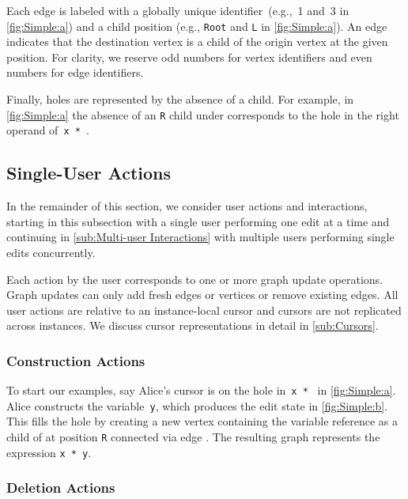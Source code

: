 Each edge is labeled with a globally unique identifier~(e.g.,~1 and~3 in \autoref{fig:Simple:a})
and a child position (e.g., \texttt{Root} and \texttt{L} in \autoref{fig:Simple:a}).
An edge indicates that the destination vertex is a child of the origin vertex at the given position.
For clarity, we reserve odd numbers for vertex identifiers and even numbers for edge identifiers.

Finally, holes are represented by the absence of a child.
For example, in \autoref{fig:Simple:a} the absence of an \texttt{R} child under \vSimpleTimes{}
corresponds to the hole in the right operand of~\texttt{x * \hole}.

\figureWrapMove{}

\subsection{Single-User Actions}%
\label{sub:Single-User Actions}

In the remainder of this section, we consider user actions and interactions,
starting in this subsection with a single user performing one edit at a time
and continuing in \autoref{sub:Multi-user Interactions} with multiple users performing single edits concurrently.

Each action by the user corresponds to one or more graph update operations.
Graph updates can only add fresh edges or vertices or remove existing edges.
All user actions are relative to an instance-local cursor and cursors are not replicated across instances.
We discuss cursor representations in detail in \autoref{sub:Cursors}.

\subsubsection{Construction Actions}%
\label{sub:Construction}

To start our examples, say Alice's cursor is on the hole in~\texttt{x * \hole} in \autoref{fig:Simple:a}.
Alice constructs the variable~\texttt{y}, which produces the edit state in \autoref{fig:Simple:b}.
This fills the hole by creating a new vertex \vSimpleY{} containing the variable reference
as a child of \vSimpleTimes{} at position \texttt{R} connected via edge \eSimpleY{}.
The resulting graph represents the expression \texttt{x * y}.

\subsubsection{Deletion Actions}%
\label{sub:Deletion}

